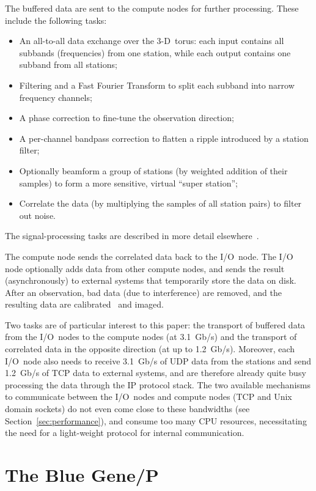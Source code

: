 \documentclass[journal]{IEEEtran}
\begin{document}
The buffered data are sent to the compute nodes for further processing.
These include the following tasks:
\begin{itemize}
\item	An all-to-all data exchange over the 3-D~torus: each input contains all
	subbands (frequencies) from one station, while each output contains
	one subband from all stations;
\item	Filtering and a Fast Fourier Transform to split each subband into
	narrow frequency channels;
\item	A phase correction to fine-tune the observation direction;
\item	A per-channel bandpass correction to flatten a ripple introduced by
	a station filter;
\item	Optionally beamform a group of stations (by weighted addition of their
	samples) to form a more sensitive, virtual ``super station'';
\item	Correlate the data (by multiplying the samples of all station pairs)
	to filter out noise.
\end{itemize}
The signal-processing tasks are described in more detail
elsewhere~\cite[Sec.~2]{Romein:06}.

The compute node sends the correlated data back to the I/O~node.
The I/O node optionally adds data from other compute nodes, and sends the
result (asynchronously) to external systems that temporarily store the data
on disk.
After an observation, bad data (due to interference) are removed, and the
resulting data are calibrated~\cite{Nijboer:07} and imaged.

Two tasks are of particular interest to this paper: the transport of buffered
data from the I/O~nodes to the compute nodes (at 3.1~Gb/s) and the transport
of correlated data in the opposite direction (at up to 1.2~Gb/s).
Moreover, each I/O~node also needs to receive 3.1~Gb/s of UDP data from the
stations and send 1.2~Gb/s of TCP data to external systems, and are therefore
already quite busy processing the data through the IP protocol stack.
The two available mechanisms to communicate between the
I/O~nodes and compute nodes (TCP and Unix domain sockets) do not even come
close to these bandwidths (see Section~\ref{sec:performance}), and consume
too many CPU resources,
necessitating the need for a light-weight protocol for internal communication.


\section{The Blue Gene/P}
\label{sec:BG/P}
\end{document}
